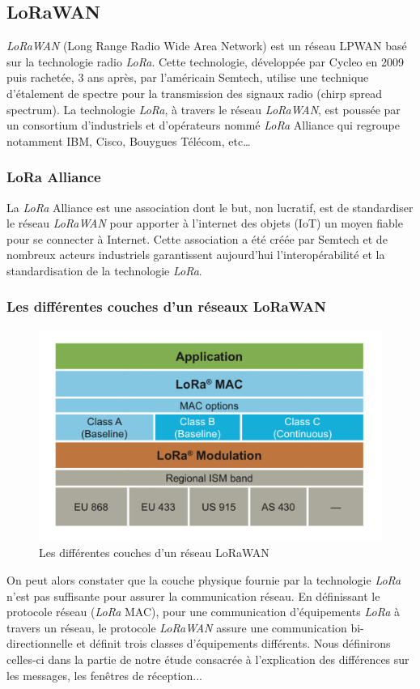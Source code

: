 \documentclass[11pt]{article}
\begin{document}
\subsection{LoRaWAN}
\textit{LoRaWAN} (Long Range Radio Wide Area Network) est un réseau LPWAN basé sur la technologie radio \textit{LoRa}.
Cette technologie, développée par Cycleo en 2009 puis rachetée, 3 ans après, par l'américain Semtech, utilise une technique d'étalement de spectre pour la transmission des signaux radio (chirp spread spectrum). 
La technologie \textit{LoRa}, à travers le réseau  \textit{LoRaWAN}, est poussée par un consortium d'industriels et d'opérateurs nommé \textit{LoRa} Alliance qui regroupe notamment IBM, Cisco, Bouygues Télécom, etc…
\subsubsection{LoRa Alliance}
La \textit{LoRa} Alliance est une association dont le but, non lucratif, est de standardiser le réseau  \textit{LoRaWAN} pour apporter à l'internet des objets (IoT) un moyen fiable pour se connecter à Internet. Cette association a été créée par Semtech et de nombreux acteurs industriels garantissent aujourd'hui l'interopérabilité et la standardisation de la technologie \textit{LoRa}. 







\subsubsection{Les différentes couches d'un réseaux LoRaWAN}
\begin{figure}[h!]
\centering
\includegraphics[scale=0.6]{couchelora.png}
\caption{Les différentes couches d'un réseau LoRaWAN}
\end{figure}
On peut alors constater que la couche physique fournie par la technologie \textit{LoRa} n'est pas suffisante pour assurer la communication réseau. En définissant le protocole réseau (\textit{LoRa} MAC), pour une communication d'équipements \textit{LoRa} à travers un réseau, le protocole  \textit{LoRaWAN} assure une communication bi-directionnelle et définit trois classes d'équipements différents. Nous définirons celles-ci dans la partie de notre étude consacrée à l'explication des différences sur les messages, les fenêtres de réception...
\newpage
\end{document}
